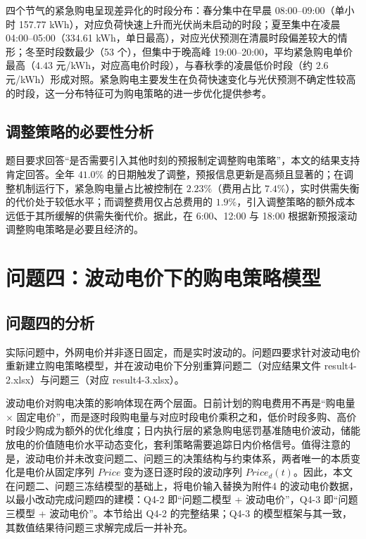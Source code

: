 \documentclass[zihao=-4,a4paper,UTF8,fontset=none]{ctexart}
\begin{document}
四个节气的紧急购电呈现差异化的时段分布：春分集中在早晨 08:00--09:00（单小时 157.77 kWh），对应负荷快速上升而光伏尚未启动的时段；夏至集中在凌晨 04:00--05:00（334.61 kWh，单日最高），对应光伏预测在清晨时段偏差较大的情形；冬至时段数最少（53 个），但集中于晚高峰 19:00--20:00，平均紧急购电单价最高（$4.43$ 元/kWh，对应高电价时段），与春秋季的凌晨低价时段（约 $2.6$ 元/kWh）形成对照。紧急购电主要发生在负荷快速变化与光伏预测不确定性较高的时段，这一分布特征可为购电策略的进一步优化提供参考。

\subsection{调整策略的必要性分析}

题目要求回答“是否需要引入其他时刻的预报制定调整购电策略”，本文的结果支持肯定回答。全年 $41.0\%$ 的日期触发了调整，预报信息更新是高频且显著的；在调整机制运行下，紧急购电量占比被控制在 $2.23\%$（费用占比 $7.4\%$），实时供需失衡的代价处于较低水平；而调整费用仅占总费用的 $1.9\%$，引入调整策略的额外成本远低于其所缓解的供需失衡代价。据此，在 6:00、12:00 与 18:00 根据新预报滚动调整购电策略是必要且经济的。

\section{问题四：波动电价下的购电策略模型}

\subsection{问题四的分析}

实际问题中，外网电价并非逐日固定，而是实时波动的。问题四要求针对波动电价重新建立购电策略模型，并在波动电价下分别重算问题二（对应结果文件 result4-2.xlsx）与问题三（对应 result4-3.xlsx）。

波动电价对购电决策的影响体现在两个层面。日前计划的购电费用不再是“购电量 $\times$ 固定电价”，而是逐时段购电量与对应时段电价乘积之和，低价时段多购、高价时段少购成为额外的优化维度；日内执行层的紧急购电惩罚基准随电价波动，储能放电的价值随电价水平动态变化，套利策略需要追踪日内价格信号。值得注意的是，波动电价并未改变问题二、问题三的决策结构与约束体系，两者唯一的本质变化是电价从固定序列 $Price$ 变为逐日逐时段的波动序列 $Price_d(t)$。因此，本文在问题二、问题三冻结模型的基础上，将电价输入替换为附件4 的波动电价数据，以最小改动完成问题四的建模：Q4-2 即“问题二模型 + 波动电价”，Q4-3 即“问题三模型 + 波动电价”。本节给出 Q4-2 的完整结果；Q4-3 的模型框架与其一致，其数值结果待问题三求解完成后一并补充。
\end{document}
